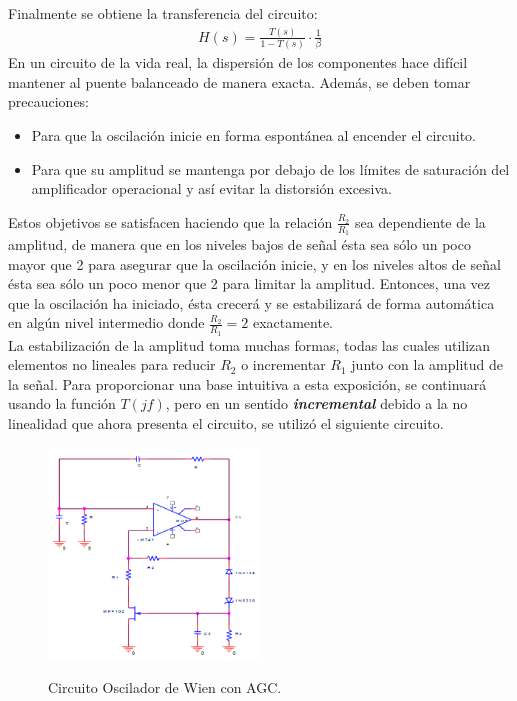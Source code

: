 Finalmente se obtiene la transferencia del circuito:
\begin{align}
H(s)=\frac{T(s)}{1-T(s)}\cdot \frac{1}{\beta}
\end{align}
En un circuito de la vida real, la dispersión de los componentes hace difícil mantener al
puente balanceado de manera exacta. Además, se deben tomar precauciones: 
\begin{itemize}
\item Para que la
oscilación inicie en forma espontánea al encender el circuito.
\item Para que su amplitud se
mantenga por debajo de los límites de saturación del amplificador operacional y así evitar la distorsión excesiva.
\end{itemize}

 Estos objetivos se satisfacen haciendo que la relación $\frac{R_2}{R_1}$ sea dependiente de la
amplitud, de manera que en los niveles bajos de señal ésta sea sólo un poco mayor que 2
para asegurar que la oscilación inicie, y en los niveles altos de señal ésta sea sólo un poco
menor que 2 para limitar la amplitud. Entonces, una vez que la oscilación ha iniciado, ésta
crecerá y se estabilizará de forma automática en algún nivel intermedio donde $\frac{R_2}{R_1}=2$
exactamente.\\
La estabilización de la amplitud toma muchas formas, todas las cuales utilizan elementos no lineales para reducir $R_2$ o incrementar $R_1$ junto con la amplitud de la señal. Para
proporcionar una base intuitiva a esta exposición, se continuará usando la función $T(jf)$,
pero en un sentido \emph{\textbf{incremental}} debido a la no linealidad que ahora presenta el circuito, se utilizó el siguiente circuito.\\
\begin{figure}[H]
	\centering
	\includegraphics[width=0.5\textwidth]{Imagenes-Ej1/oscCatedra.png}
	\label{fig:circosc}
	\caption{Circuito Oscilador de Wien con AGC.}
\end{figure}
